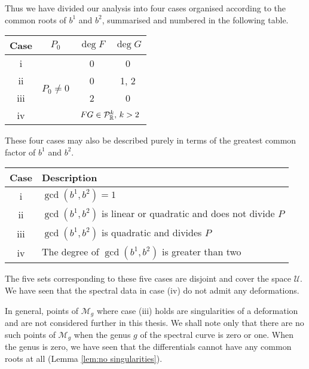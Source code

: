 \documentclass{article}
\begin{document}
Thus we have divided our analysis into four cases organised according to the common roots of $b^1$ and $b^2$, summarised and numbered in the following table.
\begin{center}
\begin{tabular}{|c|c|c|c|}
\hline
Case & $P_0$ & $\deg F$ & $\deg G$ \\ \hline\hline
i & \multirow{4}{*}{$P_0 \neq 0$} & 0 & 0 \\ \cline{1-1}\cline{3-4}
ii && 0 & 1, 2 \\ \cline{1-1}\cline{3-4}
iii && 2 & 0 \\ \cline{1-1}\cline{3-4}
iv && \multicolumn{2}{|c|}{$FG \in \mathcal{P}^k_{\mathbb{R}},\, k>2$} \\ \hline
\end{tabular}
\end{center}
These four cases may also be described purely in terms of the greatest common factor of $b^1$ and $b^2$.
\begin{center}
\begin{tabular}{|c|l|}
\hline
Case & Description\\ \hline\hline
i & $\gcd(b^1,b^2) = 1$\\ \hline
ii & $\gcd(b^1,b^2)$ is linear or quadratic and does not divide $P$ \\ \hline
iii & $\gcd(b^1,b^2)$ is quadratic and divides $P$ \\ \hline
iv & The degree of $\gcd(b^1,b^2)$ is greater than two \\ \hline
\end{tabular}
\end{center}

The five sets corresponding to these five cases are disjoint and cover the space $\mathcal{U}$. We have seen that the spectral data in case (iv) do not admit any deformations.

In general, points of $\mathcal{M}_g$ where case (iii) holds are singularities of a deformation \cite{Schmidt2016} and are not considered further in this thesis. We shall note only that there are no such points of $\mathcal{M}_g$ when the genus $g$ of the spectral curve is zero or one.
When the genus is zero, we have seen that the differentials cannot have any common roots at all (Lemma \ref{lem:no singularities}).
\end{document}
